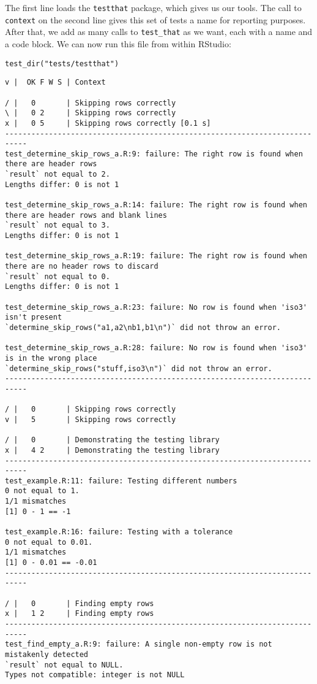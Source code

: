 The first line loads the \texttt{testthat} package,
which gives us our tools.
The call to \texttt{context} on the second line gives this set of tests a name for reporting purposes.
After that,
we add as many calls to \texttt{test\_that} as we want,
each with a name and a code block.
We can now run this file from within RStudio:

\begin{lstlisting}
test_dir("tests/testthat")
\end{lstlisting}

\begin{lstlisting}
v |  OK F W S | Context

/ |   0       | Skipping rows correctly
\ |   0 2     | Skipping rows correctly
x |   0 5     | Skipping rows correctly [0.1 s]
---------------------------------------------------------------------------
test_determine_skip_rows_a.R:9: failure: The right row is found when there are header rows
`result` not equal to 2.
Lengths differ: 0 is not 1

test_determine_skip_rows_a.R:14: failure: The right row is found when there are header rows and blank lines
`result` not equal to 3.
Lengths differ: 0 is not 1

test_determine_skip_rows_a.R:19: failure: The right row is found when there are no header rows to discard
`result` not equal to 0.
Lengths differ: 0 is not 1

test_determine_skip_rows_a.R:23: failure: No row is found when 'iso3' isn't present
`determine_skip_rows("a1,a2\nb1,b1\n")` did not throw an error.

test_determine_skip_rows_a.R:28: failure: No row is found when 'iso3' is in the wrong place
`determine_skip_rows("stuff,iso3\n")` did not throw an error.
---------------------------------------------------------------------------

/ |   0       | Skipping rows correctly
v |   5       | Skipping rows correctly

/ |   0       | Demonstrating the testing library
x |   4 2     | Demonstrating the testing library
---------------------------------------------------------------------------
test_example.R:11: failure: Testing different numbers
0 not equal to 1.
1/1 mismatches
[1] 0 - 1 == -1

test_example.R:16: failure: Testing with a tolerance
0 not equal to 0.01.
1/1 mismatches
[1] 0 - 0.01 == -0.01
---------------------------------------------------------------------------

/ |   0       | Finding empty rows
x |   1 2     | Finding empty rows
---------------------------------------------------------------------------
test_find_empty_a.R:9: failure: A single non-empty row is not mistakenly detected
`result` not equal to NULL.
Types not compatible: integer is not NULL


\end{lstlisting}
